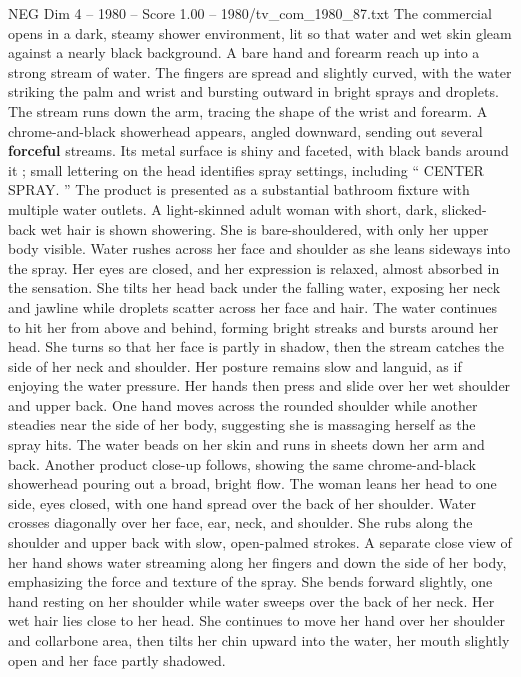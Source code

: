 \begin{textsample}{NEG Dim 4 – 1980 – Score 1.00 – 1980/tv\_com\_1980\_87.txt}  \label{ex:f4_neg_055}
The commercial opens in a dark, steamy shower environment, lit so that water and wet skin gleam against a nearly black background.
A bare hand and forearm reach up into a strong stream of water.
The fingers are spread and slightly curved, with the water striking the palm and wrist and bursting outward in bright sprays and droplets.
The stream runs down the arm, tracing the shape of the wrist and forearm.
A chrome-and-black showerhead appears, angled downward, sending out several \textbf{forceful} streams.
Its metal surface is shiny and faceted, with black bands around it ; small lettering on the head identifies spray settings, including “ CENTER SPRAY. ” The product is presented as a substantial bathroom fixture with multiple water outlets.
A light-skinned adult woman with short, dark, slicked-back wet hair is shown showering.
She is bare-shouldered, with only her upper body visible.
Water rushes across her face and shoulder as she leans sideways into the spray.
Her eyes are closed, and her expression is relaxed, almost absorbed in the sensation.
She tilts her head back under the falling water, exposing her neck and jawline while droplets scatter across her face and hair.
The water continues to hit her from above and behind, forming bright streaks and bursts around her head.
She turns so that her face is partly in shadow, then the stream catches the side of her neck and shoulder.
Her posture remains slow and languid, as if enjoying the water pressure.
Her hands then press and slide over her wet shoulder and upper back.
One hand moves across the rounded shoulder while another steadies near the side of her body, suggesting she is massaging herself as the spray hits.
The water beads on her skin and runs in sheets down her arm and back.
Another product close-up follows, showing the same chrome-and-black showerhead pouring out a broad, bright flow.
The woman leans her head to one side, eyes closed, with one hand spread over the back of her shoulder.
Water crosses diagonally over her face, ear, neck, and shoulder.
She rubs along the shoulder and upper back with slow, open-palmed strokes.
A separate close view of her hand shows water streaming along her fingers and down the side of her body, emphasizing the force and texture of the spray.
She bends forward slightly, one hand resting on her shoulder while water sweeps over the back of her neck.
Her wet hair lies close to her head.
She continues to move her hand over her shoulder and collarbone area, then tilts her chin upward into the water, her mouth slightly open and her face partly shadowed.

\end{textsample}
